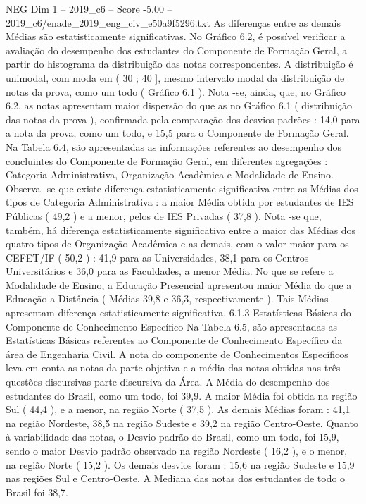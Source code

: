 \begin{textsample}{NEG Dim 1 – 2019\_c6 – Score -5.00 – 2019\_c6/enade\_2019\_eng\_civ\_e50a9f5296.txt}
As diferenças entre as demais Médias são estatisticamente significativas.
No Gráfico 6.2, é possível verificar a avaliação do desempenho dos estudantes do Componente de Formação Geral, a partir do histograma da distribuição das notas correspondentes.
A distribuição é unimodal, com moda em ( 30 ; 40 ], mesmo intervalo modal da distribuição de notas da prova, como um todo ( Gráfico 6.1 ).
Nota -se, ainda, que, no Gráfico 6.2, as notas apresentam maior dispersão do que as no Gráfico 6.1 ( distribuição das notas da prova ), confirmada pela comparação dos desvios padrões : 14,0 para a nota da prova, como um todo, e 15,5 para o Componente de Formação Geral.
Na Tabela 6.4, são apresentadas as informações referentes ao desempenho dos concluintes do Componente de Formação Geral, em diferentes agregações : Categoria Administrativa, Organização Acadêmica e Modalidade de Ensino.
Observa -se que existe diferença estatisticamente significativa entre as Médias dos tipos de Categoria Administrativa : a maior Média obtida por estudantes de IES Públicas ( 49,2 ) e a menor, pelos de IES Privadas ( 37,8 ).
Nota -se que, também, há diferença estatisticamente significativa entre a maior das Médias dos quatro tipos de Organização Acadêmica e as demais, com o valor maior para os CEFET/IF ( 50,2 ) : 41,9 para as Universidades, 38,1 para os Centros Universitários e 36,0 para as Faculdades, a menor Média.
No que se refere a Modalidade de Ensino, a Educação Presencial apresentou maior Média do que a Educação a Distância ( Médias 39,8 e 36,3, respectivamente ).
Tais Médias apresentam diferença estatisticamente significativa. 6.1.3 Estatísticas Básicas do Componente de Conhecimento Específico Na Tabela 6.5, são apresentadas as Estatísticas Básicas referentes ao Componente de Conhecimento Específico da área de Engenharia Civil.
A nota do componente de Conhecimentos Específicos leva em conta as notas da parte objetiva e a média das notas obtidas nas três questões discursivas parte discursiva da Área.
A Média do desempenho dos estudantes do Brasil, como um todo, foi 39,9.
A maior Média foi obtida na região Sul ( 44,4 ), e a menor, na região Norte ( 37,5 ).
As demais Médias foram : 41,1 na região Nordeste, 38,5 na região Sudeste e 39,2 na região Centro-Oeste.
Quanto à variabilidade das notas, o Desvio padrão do Brasil, como um todo, foi 15,9, sendo o maior Desvio padrão observado na região Nordeste ( 16,2 ), e o menor, na região Norte ( 15,2 ).
Os demais desvios foram : 15,6 na região Sudeste e 15,9 nas regiões Sul e Centro-Oeste.
A Mediana das notas dos estudantes de todo o Brasil foi 38,7.

\end{textsample}

